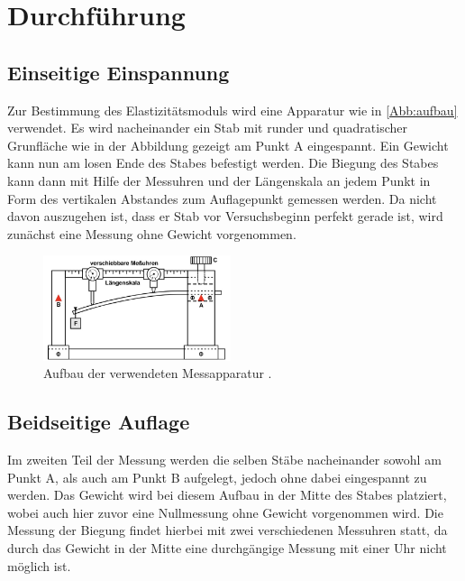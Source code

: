 \section{Durchführung}
\label{sec:Durchführung}

\subsection{Einseitige Einspannung}

Zur Bestimmung des Elastizitätsmoduls wird eine Apparatur wie in \autoref{Abb:aufbau} verwendet. Es wird nacheinander ein Stab mit runder und quadratischer Grunfläche
wie in der Abbildung gezeigt am Punkt A eingespannt. Ein Gewicht kann nun am losen Ende des Stabes befestigt werden. Die Biegung des Stabes kann dann mit Hilfe der Messuhren
und der Längenskala an jedem Punkt in Form des vertikalen Abstandes zum Auflagepunkt gemessen werden. Da nicht davon auszugehen ist, dass er Stab vor Versuchsbeginn perfekt
gerade ist, wird zunächst eine Messung ohne Gewicht vorgenommen.
\begin{figure}
    \centering
    \includegraphics[width=5.5cm]{Dateien/v103Abbildung.jpg}
    \caption{Aufbau der verwendeten Messapparatur \cite{v103}.}
    \label{Abb:aufbau}
\end{figure}


\subsection{Beidseitige Auflage}
Im zweiten Teil der Messung werden die selben Stäbe nacheinander sowohl am Punkt A, als auch am Punkt B aufgelegt, jedoch ohne dabei eingespannt zu werden. Das Gewicht wird bei
diesem Aufbau in der Mitte des Stabes platziert, wobei auch hier zuvor eine Nullmessung ohne Gewicht vorgenommen wird. Die Messung der Biegung findet hierbei mit zwei verschiedenen Messuhren
statt, da durch das Gewicht in der Mitte eine durchgängige Messung mit einer Uhr nicht möglich ist.